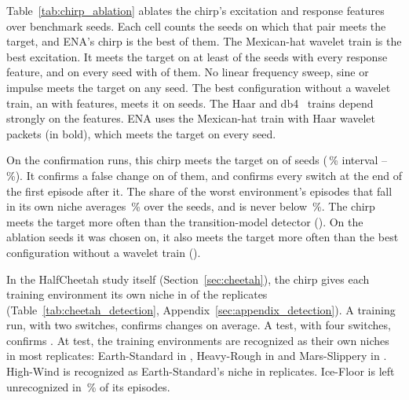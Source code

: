 Table~\ref{tab:chirp_ablation} ablates the chirp's excitation and response features over  benchmark seeds. Each cell counts the seeds on which that pair meets the target, and ENA's chirp is the best of them. The Mexican-hat wavelet train is the best excitation. It meets the target on at least  of the  seeds with every response feature, and on every seed with  of them. No linear frequency sweep, sine or impulse meets the target on any seed. The best configuration without a wavelet train, an  with  features, meets it on  seeds. The Haar and db4~\citep{daubechies1988orthonormal} trains depend strongly on the features. ENA uses the Mexican-hat train with Haar wavelet packets (in bold), which meets the target on every seed.

On the confirmation runs, this chirp meets the target on  of  seeds (\,\% interval --\,\%). It confirms a false change on  of them, and confirms every switch at the end of the first episode after it. The share of the worst environment's episodes that fall in its own niche averages \,\% over the seeds, and is never below \,\%. The chirp meets the target more often than the transition-model detector (). On the  ablation seeds it was chosen on, it also meets the target more often than the best configuration without a wavelet train ().

In the HalfCheetah study itself (Section~\ref{sec:cheetah}), the chirp gives each training environment its own niche in  of the  replicates (Table~\ref{tab:cheetah_detection}, Appendix~\ref{sec:appendix_detection}). A training run, with two switches, confirms  changes on average. A test, with four switches, confirms . At test, the training environments are recognized as their own niches in most replicates: Earth-Standard in , Heavy-Rough in  and Mars-Slippery in . High-Wind is recognized as Earth-Standard's niche in  replicates. Ice-Floor is left unrecognized in \,\% of its episodes.

